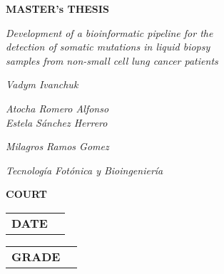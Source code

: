 \begin{titlepage}
\begin{large}
    \textbf{MASTER's THESIS}
        \signature{\break}{}
        \signature{Title}{\textit{Development of a bioinformatic pipeline for the \\ detection of somatic mutations in liquid biopsy \\ samples from non-small cell lung cancer patients}}
        \signature{Author}{\textit{Vadym Ivanchuk}}
        \signature{Supervisor}{\textit{Atocha Romero Alfonso \\ Estela Sánchez Herrero}}
        \signature{Tenured professor}{\textit{Milagros Ramos Gomez}}
        \signature{Department}{\textit{Tecnología Fotónica y Bioingeniería}}
        \signature{\break}{}
    \textbf{COURT}
        \signature{\break}{}
        \signature{President}{\textit{}}
        \signature{Vocal}{\textit{}}
        \signature{Secretary}{\textit{}}
        \signature{Substitute}{\textit{}}
        \signature{\break}{}
    \hspace*{2.05cm}\begin{tabular}{c | c}
        \textbf{DATE} & \\
    \end{tabular}
    \newline \break
    \hspace*{-1.93cm}\begin{tabular}{c | c}
        \textbf{GRADE} & \\
    \end{tabular}
\end{large}
\end{titlepage}
